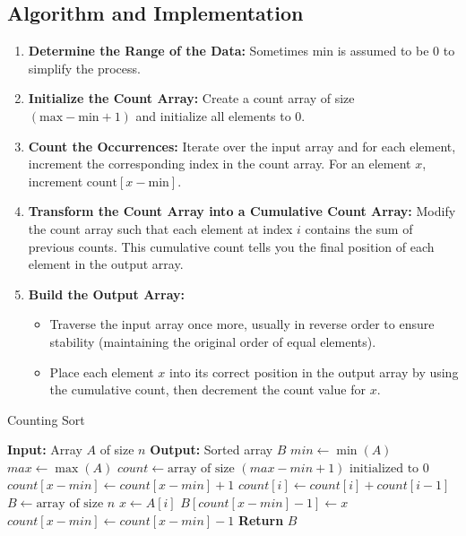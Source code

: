 \subsection{Algorithm and Implementation}
\begin{enumerate}
    \item \textbf{Determine the Range of the Data:} Sometimes min is assumed to be 0 to simplify the process.
    \item \textbf{Initialize the Count Array:} Create a count array of size \((\text{max} - \text{min} + 1)\) and initialize all elements to 0.
    \item \textbf{Count the Occurrences:} Iterate over the input array and for each element, increment the corresponding index in the count array. For an element \(x\), increment \(\text{count}[x - \text{min}]\).
    \item \textbf{Transform the Count Array into a Cumulative Count Array:} Modify the count array such that each element at index \(i\) contains the sum of previous counts. This cumulative count tells you the final position of each element in the output array.
    \item \textbf{Build the Output Array:}
    \begin{itemize}
        \item Traverse the input array once more, usually in reverse order to ensure stability (maintaining the original order of equal elements).
        \item Place each element \(x\) into its correct position in the output array by using the cumulative count, then decrement the count value for \(x\).
    \end{itemize}
\end{enumerate}

\begin{algorithm}
\caption{Counting Sort}
\begin{algorithmic}[1]
    \State \textbf{Input:} Array $A$ of size $n$
    \State \textbf{Output:} Sorted array $B$
        \State $min \gets \min(A)$
        \State $max \gets \max(A)$
        \State $count \gets \text{array of size } (max - min + 1) \text{ initialized to 0}$
            \State $count[x - min] \gets count[x - min] + 1$
        \EndFor
            \State $count[i] \gets count[i] + count[i - 1]$
        \EndFor
        \State $B \gets \text{array of size } n$
            \State $x \gets A[i]$
            \State $B[count[x - min] - 1] \gets x$
            \State $count[x - min] \gets count[x - min] - 1$
        \EndFor
        \State \textbf{Return} $B$
    \EndFunction
\end{algorithmic}
\end{algorithm}

